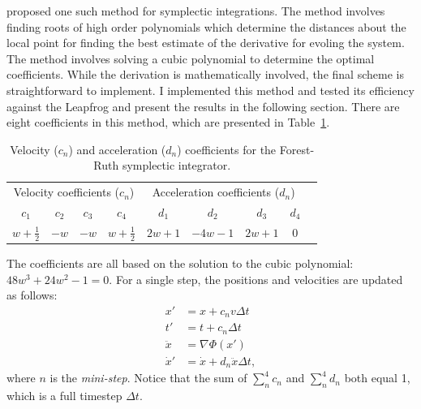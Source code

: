     \citet{1990PhyD...43..105F} proposed one such method for symplectic integrations. The method involves finding roots of high order polynomials which determine the distances about the local point for finding the best estimate of the derivative for evoling the system. The method involves solving a cubic polynomial to determine the optimal coefficients. While the derivation is mathematically involved, the final scheme is straightforward to implement. I implemented this method and tested its efficiency against the Leapfrog and present the results in the following section. There are eight coefficients in this method, which are presented in Table~\ref{tab:forest_ruth_coeffs}.
    \begin{table}[h]
        \centering
        \caption[Forest-Ruth coefficients]{Velocity (\(c_n\)) and acceleration (\(d_n\)) coefficients for the Forest-Ruth symplectic integrator.}
        \label{tab:forest_ruth_coeffs}
        \begin{tabular}{ccccc|cccc}
            \multicolumn{4}{c|}{Velocity coefficients (\(c_n\))} & \multicolumn{4}{c}{Acceleration coefficients (\(d_n\))} \\
            $c_1$ & $c_2$ & $c_3$ & $c_4$ & $d_1$ & $d_2$ & $d_3$ & $d_4$ \\
            \hline
            $w + \frac{1}{2}$ & $-w$ & $-w$ & $w + \frac{1}{2}$ & $2w + 1$ & $-4w - 1$ & $2w + 1$ & $0$ \\
        \end{tabular}
    \end{table} 
    The coefficients are all based on the solution to the cubic polynomial: $48 w^3 + 24 w^2 - 1 = 0 $. For a single step, the positions and velocities are updated as follows:
    \begin{align} 
        x' &= x + c_n v \Delta t \\ 
        t' &= t + c_n \Delta t \\ 
        \ddot{x} &= \nabla \Phi (x') \\ 
        \dot{x}' &= \dot{x} + d_n \ddot{x} \Delta t,
    \end{align}
    where $n$ is the \textit{mini-step}. Notice that the sum of $\sum_n^4 c_n$ and $\sum_n^4 d_n$ both equal 1, which is a full timestep $\Delta t$. 

